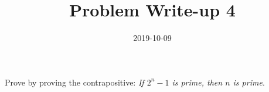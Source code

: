 \documentclass[a4paper,12pt]{article}
\title{Problem Write-up 4}
\date{2019-10-09}
\begin{document}
	\begin{problem}
		Prove by proving the contrapositive: \textit{If \(2^n - 1\) is prime, then \(n\) is prime}.
	\end{problem}
	\begin{answer}
		
	\end{answer}
\end{document}
